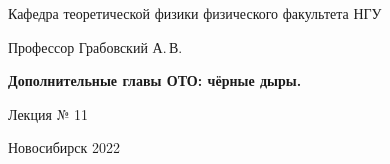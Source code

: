 \documentclass[12pt,pagesize,paper=192mm:108mm,landscape]{scrbook}
\begin{document}
\begin{titlepage}
\begin{center}
    Кафедра теоретической физики физического факультета НГУ
    \medskip

    \Large
    Профессор Грабовский А.\,В.
    \smallskip

    \Large
    \textbf{Дополнительные главы ОТО: чёрные дыры.}
    \smallskip

    \Large
    Лекция № 11
    \vfill


    \normalsize \ccbysa\hspace{0.5em}  Новосибирск 2022
  \end{center}
\end{titlepage}
\end{document}
